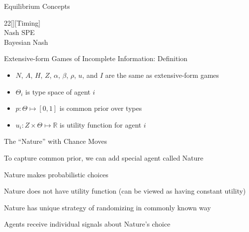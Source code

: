 \documentclass[11pt,aspectratio=169]{beamer}
\begin{document}
  \begin{frame}{Equilibrium Concepts}
   \begin{center}
   \renewcommand{\gamestretch}{4}
   \ssualfalse
   \setlength{\fboxrule}{0em}
   \setlength{\fboxsep}{0.5em} 
    \begin{game}{2}{2}[{\Large{}}][\Large Timing]
     \> {\footnotesize{}}	\> {\footnotesize{}}	\\
     {\footnotesize{}}	\> Nash	\> SPE \\
     {\footnotesize{}} \> Bayesian Nash \> 
    \end{game}
   \end{center}
  \end{frame}
  
  
  \begin{frame}{Extensive-form Games of Incomplete Information: Definition}
   \begin{itemize}
   \setlength{\itemsep}{1.5em}
    \item $N$, $A$, $H$, $Z$, $\alpha$, $\beta$, $\rho$, $u$, and $I$ are the same as extensive-form games
    \item $\Theta_i$ is type space of agent $i$
    \item $p: \Theta \mapsto [0, 1]$ is common prior over types
    \item $u_i: Z \times \Theta \mapsto \mathbb{R}$ is utility function for agent $i$
   \end{itemize}
  \end{frame}
  
 
  \begin{frame}{The ``Nature'' with Chance Moves}
   \begin{itemizes}[1.2em]
    \item To capture common prior, we can add special agent called \alert{Nature}
    \item Nature makes \alert{probabilistic choices}
    \item Nature \alert{does not} have utility function (can be viewed as having constant utility)
    \item Nature has unique strategy of randomizing in \alert{commonly known} way
    \item Agents receive individual signals about Nature's choice
   \end{itemizes}
  \end{frame}
  
\end{document}
